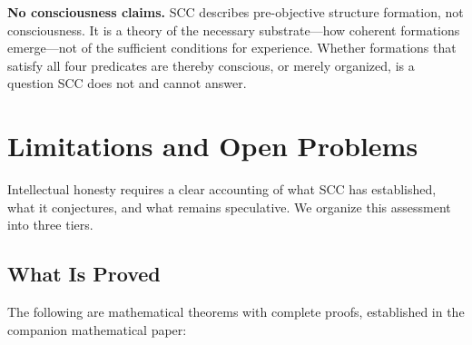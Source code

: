 \documentclass[lettersize,journal]{IEEEtran}
\begin{document}
\textbf{No consciousness claims.} SCC describes pre-objective structure formation, not consciousness. It is a theory of the necessary substrate---how coherent formations emerge---not of the sufficient conditions for experience. Whether formations that satisfy all four predicates are thereby conscious, or merely organized, is a question SCC does not and cannot answer.


\section{Limitations and Open Problems}

Intellectual honesty requires a clear accounting of what SCC has established, what it conjectures, and what remains speculative. We organize this assessment into three tiers.

\subsection{What Is Proved}

The following are mathematical theorems with complete proofs, established in the companion mathematical paper:
\end{document}
